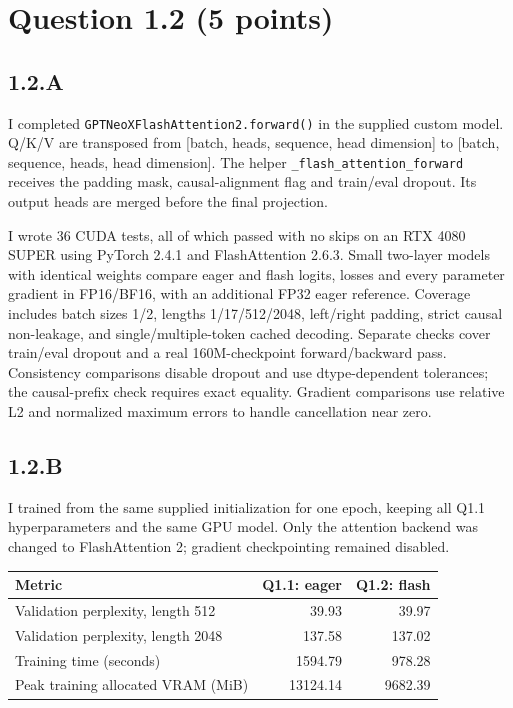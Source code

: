 \documentclass{article}
\begin{document}
\clearpage
\section*{Question 1.2 (5 points)}
\subsection*{1.2.A}
I completed \texttt{GPTNeoXFlashAttention2.forward()} in the supplied custom model. Q/K/V are transposed from [batch, heads, sequence, head dimension] to [batch, sequence, heads, head dimension]. The helper \nolinkurl{_flash_attention_forward} receives the padding mask, causal-alignment flag and train/eval dropout. Its output heads are merged before the final projection.

I wrote 36 CUDA tests, all of which passed with no skips on an RTX 4080 SUPER using PyTorch 2.4.1 and FlashAttention 2.6.3. Small two-layer models with identical weights compare eager and flash logits, losses and every parameter gradient in FP16/BF16, with an additional FP32 eager reference. Coverage includes batch sizes 1/2, lengths 1/17/512/2048, left/right padding, strict causal non-leakage, and single/multiple-token cached decoding. Separate checks cover train/eval dropout and a real 160M-checkpoint forward/backward pass. Consistency comparisons disable dropout and use dtype-dependent tolerances; the causal-prefix check requires exact equality. Gradient comparisons use relative L2 and normalized maximum errors to handle cancellation near zero.

\subsection*{1.2.B}
I trained from the same supplied initialization for one epoch, keeping all Q1.1 hyperparameters and the same GPU model. Only the attention backend was changed to FlashAttention 2; gradient checkpointing remained disabled.

\begin{center}
\begin{tabular}{lrr}
\toprule
Metric & Q1.1: eager & Q1.2: flash \\
\midrule
Validation perplexity, length 512 & 39.93 & 39.97 \\
Validation perplexity, length 2048 & 137.58 & 137.02 \\
Training time (seconds) & 1594.79 & 978.28 \\
Peak training allocated VRAM (MiB) & 13124.14 & 9682.39 \\
\bottomrule
\end{tabular}
\end{center}
\end{document}
